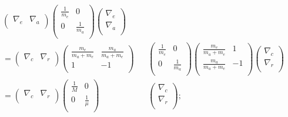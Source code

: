 \documentclass[11pt,a4paper]{jsarticle}
\begin{document}
\begin{eqnarray}
\left( \begin{array}{cc} \nabla_e & \nabla_a\\ \end{array} \right) \left(\begin{array}{cc} \frac{1}{m_e} &0 \\ 0 &  \frac{1}{m_a} \\ \end{array} \right) \left( \begin{array}{cc} \nabla_e \\ \nabla_a\\ \end{array} \right) &&\\= \left( \begin{array}{cc} \nabla_c & \nabla_r\\ \end{array} \right) \left(\begin{array}{cc} \frac{m_e}{m_a + m_e} & \frac{m_a}{m_a + m_e} \\ 1 & -1 \\ \end{array} \right) &&\left(\begin{array}{cc} \frac{1}{m_e} &0 \\ 0 &  \frac{1}{m_a} \\ \end{array} \right) \left(\begin{array}{cc} \frac{m_e}{m_a + m_e} & 1 \\ \frac{m_a}{m_a + m_e} & -1 \\ \end{array} \right) \left( \begin{array}{cc} \nabla_c \\ \nabla_r\\ \end{array} \right)\\
= \left( \begin{array}{cc} \nabla_c & \nabla_r\\ \end{array} \right) \left(\begin{array}{cc} \frac{1}{M} & 0 \\ 0 & \frac{1}{\mu} \\ \end{array} \right) &&\left( \begin{array}{cc} \nabla_c \\ \nabla_r\\ \end{array} \right) ;\\
\end{eqnarray}
\end{document}
